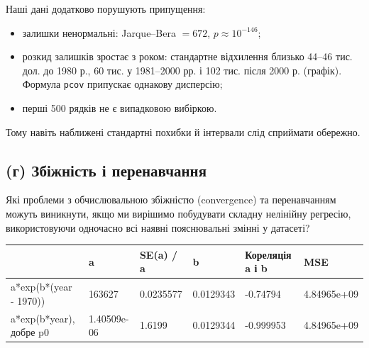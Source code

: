Наші дані додатково порушують припущення:

\begin{itemize}
\item
  залишки ненормальні: Jarque--Bera \(=672\), \(p\approx10^{-146}\);
\item
  розкид залишків зростає з роком: стандартне відхилення близько 44--46
  тис. дол. до 1980 р., 60 тис. у 1981--2000 рр. і 102 тис. після 2000
  р. (графік). Формула \texttt{pcov} припускає однакову дисперсію;
\item
  перші 500 рядків не є випадковою вибіркою.
\end{itemize}

Тому навіть наближені стандартні похибки й інтервали слід сприймати
обережно.


\Needspace{186.0pt}

\subsection{(г) Збіжність і перенавчання}

\begin{taskstatement}
Які проблеми з обчислювальною збіжністю (convergence) та перенавчанням
можуть виникнути, якщо ми вирішимо побудувати складну нелінійну
регресію, використовуючи одночасно всі наявні пояснювальні змінні у
датасеті?
\end{taskstatement}



\Needspace{37.599999999999994pt}


\begingroup\fontsize{7.5}{9.5}\selectfont\setlength{\tabcolsep}{2.5mm}\renewcommand{\arraystretch}{1.15}
\par\vspace{2pt}\noindent\begin{tabular}{|llllll|}
\hline
 & a & SE(a) / a & b & Кореляція a і b & MSE \\
\hline
a*exp(b*(year - 1970)) & 163627 & 0.0235577 & 0.0129343 & -0.74794 & 4.84965e+09 \\
a*exp(b*year), добре p0 & 1.40509e-06 & 1.6199 & 0.0129344 & -0.999953 & 4.84965e+09 \\
\hline
\end{tabular}\par\vspace{2pt}
\endgroup


